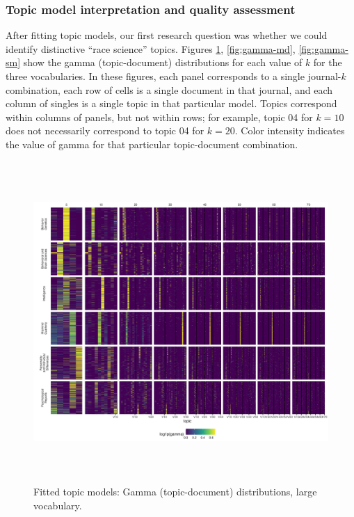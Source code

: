 \documentclass[12pt]{article}
\begin{document}
\hypertarget{topic-model-interpretation-and-quality-assessment}{%
\subsubsection{Topic model interpretation and quality assessment}\label{topic-model-interpretation-and-quality-assessment}}

After fitting topic models, our first research question was whether we could identify distinctive ``race science'' topics. Figures \ref{fig:gamma-lg}, \ref{fig:gamma-md}, \ref{fig:gamma-sm} show the gamma (topic-document) distributions for each value of \(k\) for the three vocabularies. In these figures, each panel corresponds to a single journal-\(k\) combination, each row of cells is a single document in that journal, and each column of singles is a single topic in that particular model. Topics correspond within columns of panels, but not within rows; for example, topic 04 for \(k=10\) does not necessarily correspond to topic 04 for \(k=20\). Color intensity indicates the value of gamma for that particular topic-document combination.

\begin{figure}
\centering
\includegraphics[width=6in,height=4.8in]{img/05_lg_gamma.png}
\caption{Fitted topic models: Gamma (topic-document) distributions, large vocabulary. \label{fig:gamma-lg}}
\end{figure}
\end{document}

